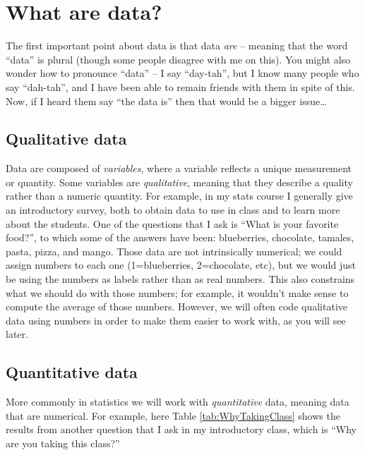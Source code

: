 \documentclass[
  12pt,
]{book}
\begin{document}
\hypertarget{what-are-data}{%
\section{What are data?}\label{what-are-data}}

The first important point about data is that data \emph{are} -- meaning that the word ``data'' is plural (though some people disagree with me on this). You might also wonder how to pronounce ``data'' -- I say ``day-tah'', but I know many people who say ``dah-tah'', and I have been able to remain friends with them in spite of this. Now, if I heard them say ``the data is'' then that would be a bigger issue\ldots{}

\hypertarget{qualitative-data}{%
\subsection{Qualitative data}\label{qualitative-data}}

Data are composed of \emph{variables}, where a variable reflects a unique measurement or quantity. Some variables are \emph{qualitative}, meaning that they describe a quality rather than a numeric quantity. For example, in my stats course I generally give an introductory survey, both to obtain data to use in class and to learn more about the students. One of the questions that I ask is ``What is your favorite food?'', to which some of the answers have been: blueberries, chocolate, tamales, pasta, pizza, and mango. Those data are not intrinsically numerical; we could assign numbers to each one (1=blueberries, 2=chocolate, etc), but we would just be using the numbers as labels rather than as real numbers. This also constrains what we should do with those numbers; for example, it wouldn't make sense to compute the average of those numbers. However, we will often code qualitative data using numbers in order to make them easier to work with, as you will see later.

\hypertarget{quantitative-data}{%
\subsection{Quantitative data}\label{quantitative-data}}

More commonly in statistics we will work with \emph{quantitative} data, meaning data that are numerical. For example, here Table \ref{tab:WhyTakingClass} shows the results from another question that I ask in my introductory class, which is ``Why are you taking this class?''
\end{document}
